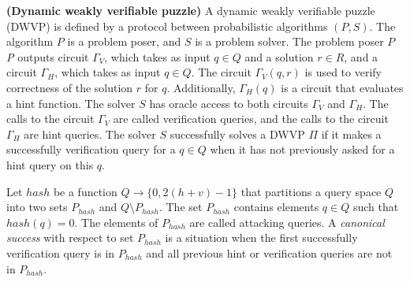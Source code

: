 \begin{definition} {\textbf{(Dynamic weakly verifiable puzzle)}}
  A dynamic weakly verifiable puzzle (DWVP) is defined by a protocol between probabilistic algorithms $(P,S)$.
  The algorithm $P$ is a problem poser, and $S$ is a problem solver.
  The problem poser $P$
  \textit{P} outputs circuit $\Gamma_{V}$, which takes as input $q \in Q$ and a solution $r \in R$,
  and a circuit $\Gamma_{H}$, which takes as input $q \in Q$.
  The circuit $\Gamma_{V}(q,r)$ is used to verify correctness of the solution $r$ for $q$.
  Additionally, $\Gamma_{H}(q)$ is a circuit that evaluates a hint function.
  The solver $S$ has oracle access to both circuits $\Gamma_V$ and $\Gamma_H$.
  The calls to the circuit $\Gamma_V$ are called verification queries, and the calls to the circuit $\Gamma_H$ are hint queries.
  The solver $S$ successfully solves a DWVP $\Pi$ if it makes a successfully verification query for a $q \in Q$ when
  it has not previously asked for a hint query on this $q$.
\end{definition}
%
Let $hash$ be a function $Q \rightarrow \{0, 2(h+v)-1 \}$ that partitions a query space $Q$ into two sets $P_{hash}$ and $Q \setminus P_{hash}$.
The set $P_{hash}$ contains elements $q \in Q$ such that $hash(q) = 0$.
The elements of $P_{hash}$ are called attacking queries.
A \textit{canonical success} with respect to set $P_{hash}$ is a situation when the first successfully verification query is in $P_{hash}$
and all previous hint or verification queries are not in $P_{hash}$.
%

